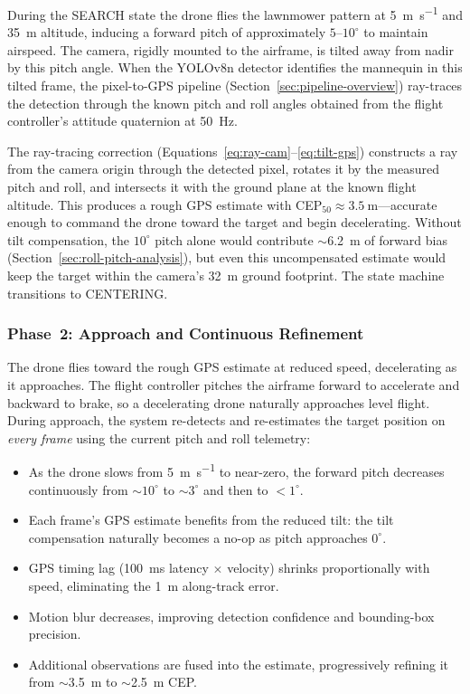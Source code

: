 During the SEARCH state the drone flies the lawnmower pattern at \SI{5}{\metre\per\second} and \SI{35}{\metre} altitude, inducing a forward pitch of approximately $5$--$10^{\circ}$ to maintain airspeed.  The camera, rigidly mounted to the airframe, is tilted away from nadir by this pitch angle.  When the YOLOv8n detector identifies the mannequin in this tilted frame, the pixel-to-GPS pipeline (Section~\ref{sec:pipeline-overview}) ray-traces the detection through the known pitch and roll angles obtained from the flight controller's attitude quaternion at \SI{50}{\hertz}.

The ray-tracing correction (Equations~\ref{eq:ray-cam}--\ref{eq:tilt-gps}) constructs a ray from the camera origin through the detected pixel, rotates it by the measured pitch and roll, and intersects it with the ground plane at the known flight altitude.  This produces a rough GPS estimate with CEP$_{50} \approx \SI{3.5}{\metre}$---accurate enough to command the drone toward the target and begin decelerating.  Without tilt compensation, the $10^{\circ}$ pitch alone would contribute $\sim$\SI{6.2}{\metre} of forward bias (Section~\ref{sec:roll-pitch-analysis}), but even this uncompensated estimate would keep the target within the camera's \SI{32}{\metre} ground footprint.  The state machine transitions to CENTERING.

\subsubsection{Phase~2: Approach and Continuous Refinement}

The drone flies toward the rough GPS estimate at reduced speed, decelerating as it approaches.  The flight controller pitches the airframe forward to accelerate and backward to brake, so a decelerating drone naturally approaches level flight.  During approach, the system re-detects and re-estimates the target position on \emph{every frame} using the current pitch and roll telemetry:

\begin{itemize}
  \item As the drone slows from \SI{5}{\metre\per\second} to near-zero, the forward pitch decreases continuously from $\sim$$10^{\circ}$ to $\sim$$3^{\circ}$ and then to $< 1^{\circ}$.
  \item Each frame's GPS estimate benefits from the reduced tilt: the tilt compensation naturally becomes a no-op as pitch approaches $0^{\circ}$.
  \item GPS timing lag (\SI{100}{\milli\second} latency $\times$ velocity) shrinks proportionally with speed, eliminating the \SI{1}{\metre} along-track error.
  \item Motion blur decreases, improving detection confidence and bounding-box precision.
  \item Additional observations are fused into the estimate, progressively refining it from $\sim$\SI{3.5}{\metre} to $\sim$\SI{2.5}{\metre} CEP.
\end{itemize}

